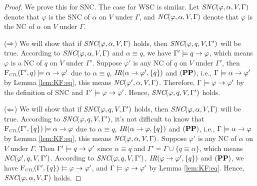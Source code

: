 \documentclass[letterpaper]{article} %
\begin{document}
\begin{proof}
    We prove this for SNC. The case for WSC is similar.
    Let $\emph{SNC}(\varphi,\alpha,V,\Gamma)$ denote that $\varphi$ is the SNC of $\alpha$ on $V$ under $\Gamma$, and  $\emph{NC}(\varphi,\alpha,V,\Gamma)$ denote that $\varphi$ is the NC of $\alpha$ on $V$ under $\Gamma$.

    ($\Rightarrow$) We will show that if $\emph{SNC}(\varphi,\alpha,V,\Gamma)$ holds, then $\emph{SNC}(\varphi,q,V,\Gamma')$ will be true. According to $\emph{SNC}(\varphi,\alpha,V,\Gamma)$ and $\alpha\equiv q$, we have $\Gamma' \models q\rightarrow \varphi$, which means $\varphi$ is a NC of $q$ on $V$ under $\Gamma'$. Suppose $\varphi'$ is any NC of $q$ on $V$ under $\Gamma'$, then ${\textsc{F}_{\textsc{ctl}}}(\Gamma',q)\models \alpha \rightarrow \varphi'$ due to $\alpha\equiv q$, $\emph{IR}(\alpha \rightarrow \varphi', \{q\})$ and $(\textbf{PP})$, i.e., $\Gamma \models \alpha \rightarrow \varphi'$ by Lemma \ref{lem:KF:eq}, this means $\emph{NC}(\varphi',\alpha,V,\Gamma)$. Therefore, $\Gamma \models \varphi \rightarrow \varphi'$ by the definition of SNC and $\Gamma' \models \varphi \rightarrow \varphi'$. Hence, $\emph{SNC}(\varphi,q,V,\Gamma')$ holds.

    ($\Leftarrow$) We will show that if $\emph{SNC}(\varphi,q,V,\Gamma')$ holds, then $\emph{SNC}(\varphi,\alpha,V,\Gamma)$ will be true. According to $\emph{SNC}(\varphi,q,V,\Gamma')$, it's not difficult to know that ${\textsc{F}_{\textsc{ctl}}}(\Gamma', \{q\})\models \alpha \rightarrow \varphi$ due to $\alpha\equiv q$, $\emph{IR}(\alpha \rightarrow \varphi, \{q\})$ and $(\textbf{PP})$, i.e., $\Gamma \models \alpha \rightarrow \varphi$ by Lemma \ref{lem:KF:eq}, this means $\emph{NC}(\varphi,\alpha,V,\Gamma)$. Suppose $\varphi'$ is any NC of $\alpha$ on $V$ under $\Gamma$. Then $\Gamma' \models q \rightarrow \varphi'$ since $\alpha\equiv q$ and $\Gamma'=\Gamma \cup \{q\equiv \alpha\}$, which means $\emph{NC}(\varphi',q,V,\Gamma')$. According to $\emph{SNC}(\varphi,q,V,\Gamma')$, $\emph{IR}(\varphi \rightarrow \varphi', \{q\})$ and $(\textbf{PP})$, we have
    ${\textsc{F}_{\textsc{ctl}}}(\Gamma', \{q\})\models \varphi \rightarrow \varphi'$, and $\Gamma \models \varphi \rightarrow \varphi'$ by Lemma \ref{lem:KF:eq}. Hence, $\emph{SNC}(\varphi,\alpha,V, \Gamma)$ holds.
    \end{proof}
\end{document}
